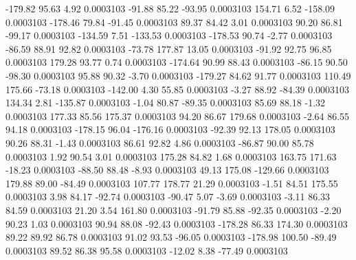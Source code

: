      -179.82       95.63        4.92     0.0003103
      -91.88       85.22      -93.95     0.0003103
      154.71        6.52     -158.09     0.0003103
     -178.46       79.84      -91.45     0.0003103
       89.37       84.42        3.01     0.0003103
       90.20       86.81      -99.17     0.0003103
     -134.59        7.51     -133.53     0.0003103
     -178.53       90.74       -2.77     0.0003103
      -86.59       88.91       92.82     0.0003103
      -73.78      177.87       13.05     0.0003103
      -91.92       92.75       96.85     0.0003103
      179.28       93.77        0.74     0.0003103
     -174.64       90.99       88.43     0.0003103
      -86.15       90.50      -98.30     0.0003103
       95.88       90.32       -3.70     0.0003103
     -179.27       84.62       91.77     0.0003103
      110.49      175.66      -73.18     0.0003103
     -142.00        4.30       55.85     0.0003103
       -3.27       88.92      -84.39     0.0003103
      134.34        2.81     -135.87     0.0003103
       -1.04       80.87      -89.35     0.0003103
       85.69       88.18       -1.32     0.0003103
      177.33       85.56      175.37     0.0003103
       94.20       86.67      179.68     0.0003103
       -2.64       86.55       94.18     0.0003103
     -178.15       96.04     -176.16     0.0003103
      -92.39       92.13      178.05     0.0003103
       90.26       88.31       -1.43     0.0003103
       86.61       92.82        4.86     0.0003103
      -86.87       90.00       85.78     0.0003103
        1.92       90.54        3.01     0.0003103
      175.28       84.82        1.68     0.0003103
      163.75      171.63      -18.23     0.0003103
      -88.50       88.48       -8.93     0.0003103
       49.13      175.08     -129.66     0.0003103
      179.88       89.00      -84.49     0.0003103
      107.77      178.77       21.29     0.0003103
       -1.51       84.51      175.55     0.0003103
        3.98       84.17      -92.74     0.0003103
      -90.47        5.07       -3.69     0.0003103
       -3.11       86.33       84.59     0.0003103
       21.20        3.54      161.80     0.0003103
      -91.79       85.88      -92.35     0.0003103
       -2.20       90.23        1.03     0.0003103
       90.94       88.08      -92.43     0.0003103
     -178.28       86.33      174.30     0.0003103
       89.22       89.92       86.78     0.0003103
       91.02       93.53      -96.05     0.0003103
     -178.98      100.50      -89.49     0.0003103
       89.52       86.38       95.58     0.0003103
      -12.02        8.38      -77.49     0.0003103
